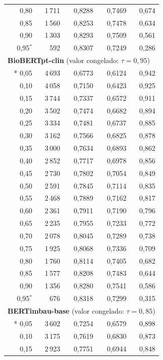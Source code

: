 \begin{longtable}{@{\extracolsep{\fill}}rrrrr}
0{,}80 & 1\,711 & 0{,}8288 & 0{,}7469 & 0{,}674 \\
0{,}85 & 1\,560 & 0{,}8253 & 0{,}7478 & 0{,}634 \\
0{,}90 & 1\,303 & 0{,}8293 & 0{,}7509 & 0{,}561 \\
0{,}95$^{\ast}$ & 592 & 0{,}8307 & 0{,}7249 & 0{,}286 \\
\midrule
\multicolumn{5}{l}{\textbf{BioBERTpt-clin} (valor congelado: $\tau=0{,}95$)} \\*
0{,}05 & 4\,693 & 0{,}6773 & 0{,}6124 & 0{,}942 \\
0{,}10 & 4\,058 & 0{,}7150 & 0{,}6423 & 0{,}925 \\
0{,}15 & 3\,744 & 0{,}7337 & 0{,}6572 & 0{,}911 \\
0{,}20 & 3\,502 & 0{,}7474 & 0{,}6682 & 0{,}894 \\
0{,}25 & 3\,334 & 0{,}7481 & 0{,}6737 & 0{,}885 \\
0{,}30 & 3\,162 & 0{,}7566 & 0{,}6825 & 0{,}878 \\
0{,}35 & 3\,000 & 0{,}7634 & 0{,}6893 & 0{,}862 \\
0{,}40 & 2\,852 & 0{,}7717 & 0{,}6978 & 0{,}856 \\
0{,}45 & 2\,730 & 0{,}7802 & 0{,}7054 & 0{,}849 \\
0{,}50 & 2\,591 & 0{,}7845 & 0{,}7114 & 0{,}835 \\
0{,}55 & 2\,468 & 0{,}7889 & 0{,}7162 & 0{,}817 \\
0{,}60 & 2\,361 & 0{,}7911 & 0{,}7190 & 0{,}796 \\
0{,}65 & 2\,235 & 0{,}7955 & 0{,}7233 & 0{,}772 \\
0{,}70 & 2\,078 & 0{,}8045 & 0{,}7289 & 0{,}738 \\
0{,}75 & 1\,925 & 0{,}8068 & 0{,}7336 & 0{,}709 \\
0{,}80 & 1\,760 & 0{,}8114 & 0{,}7405 & 0{,}682 \\
0{,}85 & 1\,577 & 0{,}8208 & 0{,}7483 & 0{,}644 \\
0{,}90 & 1\,356 & 0{,}8280 & 0{,}7541 & 0{,}586 \\
0{,}95$^{\ast}$ & 676 & 0{,}8318 & 0{,}7299 & 0{,}315 \\
\midrule
\multicolumn{5}{l}{\textbf{BERTimbau-base} (valor congelado: $\tau=0{,}85$)} \\*
0{,}05 & 3\,602 & 0{,}7254 & 0{,}6579 & 0{,}898 \\
0{,}10 & 3\,175 & 0{,}7619 & 0{,}6830 & 0{,}873 \\
0{,}15 & 2\,923 & 0{,}7751 & 0{,}6944 & 0{,}848 \\

\end{longtable}
